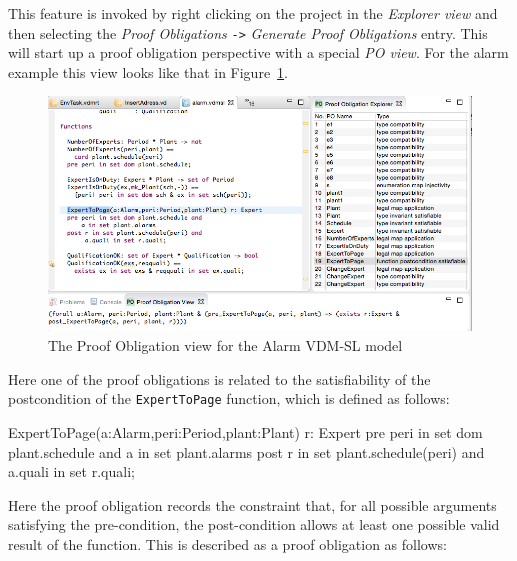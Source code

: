 This feature is invoked by right clicking on the project in the \emph{Explorer view} and then selecting the \emph{Proof Obligations} \texttt{->} \emph{Generate Proof Obligations} entry. This will start up a proof obligation perspective with a special \emph{PO view}. For the alarm example this view looks like that in Figure~\ref{fig:POview}.
%
\begin{figure}[htbp]
\begin{center}
\includegraphics[width=5.5in]{figures/poview}
\caption{The Proof Obligation view for the Alarm VDM-SL model\label{fig:POview}}
\end{center}
\end{figure}
%
Here one of the proof obligations is related to the satisfiability of the postcondition of the \texttt{ExpertToPage} function, which is defined as follows: 

\begin{vdmsl}
ExpertToPage(a:Alarm,peri:Period,plant:Plant) r: Expert
  pre peri in set dom plant.schedule and
      a in set plant.alarms
  post r in set plant.schedule(peri) and
       a.quali in set r.quali;
\end{vdmsl}


Here the proof obligation records the constraint that, for all possible arguments satisfying the pre-condition, the post-condition allows at least one possible valid result of the function. This is described as a proof obligation as follows: 

